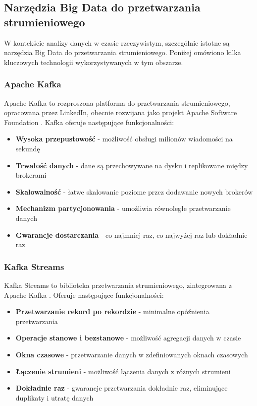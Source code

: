 \subsection{Narzędzia Big Data do przetwarzania strumieniowego}
\label{subsec:narzedzia_big_data}

W kontekście analizy danych w czasie rzeczywistym, szczególnie istotne są narzędzia Big Data do przetwarzania strumieniowego. Poniżej omówiono kilka kluczowych technologii wykorzystywanych w tym obszarze.

\subsubsection{Apache Kafka}
\label{subsubsec:apache_kafka}

Apache Kafka to rozproszona platforma do przetwarzania strumieniowego, opracowana przez LinkedIn, obecnie rozwijana jako projekt Apache Software Foundation \citep{kafka}. Kafka oferuje następujące funkcjonalności:

\begin{itemize}
    \item \textbf{Wysoka przepustowość} - możliwość obsługi milionów wiadomości na sekundę
    \item \textbf{Trwałość danych} - dane są przechowywane na dysku i replikowane między brokerami
    \item \textbf{Skalowalność} - łatwe skalowanie poziome przez dodawanie nowych brokerów
    \item \textbf{Mechanizm partycjonowania} - umożliwia równoległe przetwarzanie danych
    \item \textbf{Gwarancje dostarczania} - co najmniej raz, co najwyżej raz lub dokładnie raz
\end{itemize}

\subsubsection{Kafka Streams}
\label{subsubsec:kafka_streams}

Kafka Streams to biblioteka przetwarzania strumieniowego, zintegrowana z Apache Kafka \citep{kafka_streams}. Oferuje następujące funkcjonalności:

\begin{itemize}
    \item \textbf{Przetwarzanie rekord po rekordzie} - minimalne opóźnienia przetwarzania
    \item \textbf{Operacje stanowe i bezstanowe} - możliwość agregacji danych w czasie
    \item \textbf{Okna czasowe} - przetwarzanie danych w zdefiniowanych oknach czasowych
    \item \textbf{Łączenie strumieni} - możliwość łączenia danych z różnych strumieni
    \item \textbf{Dokładnie raz} - gwarancje przetwarzania dokładnie raz, eliminujące duplikaty i utratę danych
\end{itemize}

